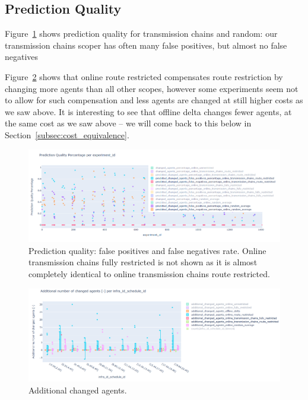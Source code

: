 \documentclass{article}
\begin{document}
\subsection{Prediction Quality}

Figure~\ref{fig:prediction_quality} shows prediction quality for transmission chains and random: our transmission chains scoper has often many false positives, but almost no false negatives

Figure~\ref{fig:additional_changed_agents} shows that online route restricted compensates route restriction by changing more agents than all other scopes, however some experiments seem not to allow for such compensation and less agents are changed at still higher costs as we saw above. It is interesting to see that offline delta changes fewer agents, at the same cost as we saw above -- we will come back to this below in Section~\ref{subsec:cost_equivalence}.

\begin{figure}[hbtp]
    \includegraphics[width=\textwidth]{Figures/04_computational_results/prediction_quality.PNG}
	\caption{Prediction quality: false positives and false negatives rate. Online transmission chains fully restricted is not shown as it is almost completely identical to online transmission chains route restricted.}
	\label{fig:prediction_quality}
\end{figure}

\begin{figure}[hbtp]
    \includegraphics[width=\textwidth]{Figures/04_computational_results/additional_changed_agents.PNG}
	\caption{Additional changed agents.}
	\label{fig:additional_changed_agents}
\end{figure}
\end{document}
